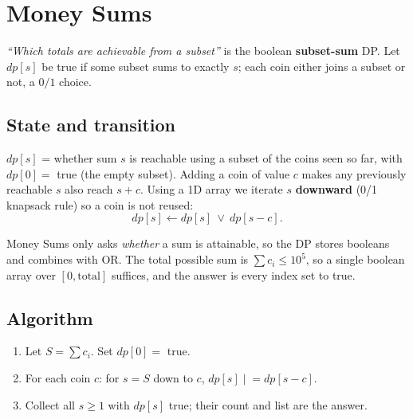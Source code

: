 \section{Money Sums}
\label{sec:cses-money-sums}


\begin{patternbox}
\emph{``Which totals are achievable from a subset''} is the boolean
\textbf{subset-sum} DP. Let $\textit{dp}[s]$ be true if some subset sums
to exactly $s$; each coin either joins a subset or not, a $0/1$ choice.
\end{patternbox}

\subsection*{State and transition}

$\textit{dp}[s]$ = whether sum $s$ is reachable using a subset of the
coins seen so far, with $\textit{dp}[0]=$ true (the empty subset). Adding
a coin of value $c$ makes any previously reachable $s$ also reach $s+c$.
Using a 1D array we iterate $s$ \textbf{downward} (0/1 knapsack rule) so a
coin is not reused:
\[
  \textit{dp}[s]\gets \textit{dp}[s]\ \lor\ \textit{dp}[s-c].
\]

\begin{ideabox}
Money Sums only asks \emph{whether} a sum is attainable, so the DP stores
booleans and combines with OR. The total possible sum is
$\sum c_i\le10^5$, so a single boolean array over $[0,\text{total}]$
suffices, and the answer is every index set to true.
\end{ideabox}

\subsection*{Algorithm}

\begin{enumerate}
  \item Let $S=\sum c_i$. Set $\textit{dp}[0]=$ true.
  \item For each coin $c$: for $s=S$ down to $c$,
        $\textit{dp}[s]\mathrel{|}=\textit{dp}[s-c]$.
  \item Collect all $s\ge1$ with $\textit{dp}[s]$ true; their count and
        list are the answer.
\end{enumerate}

